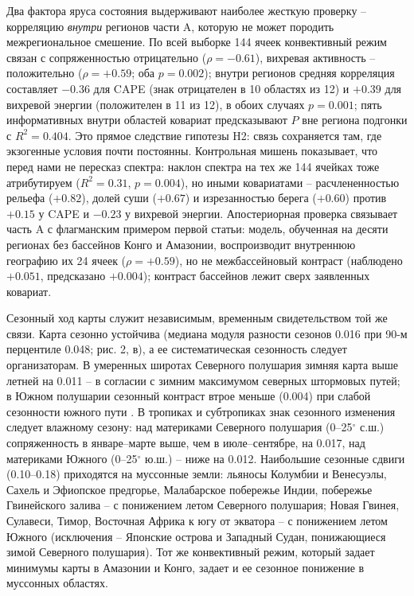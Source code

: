 \documentclass[12pt,a4paper]{article}
\begin{document}
Два фактора яруса состояния выдерживают наиболее жесткую проверку -- корреляцию \emph{внутри} регионов части A, которую не может породить межрегиональное смешение. По всей выборке 144 ячеек конвективный режим связан с сопряженностью отрицательно ($\rho = -0.61$), вихревая активность -- положительно ($\rho = +0.59$; оба $p = 0.002$); внутри регионов средняя корреляция составляет $-0.36$ для CAPE (знак отрицателен в 10 областях из 12) и $+0.39$ для вихревой энергии (положителен в 11 из 12), в обоих случаях $p = 0.001$; пять информативных внутри областей ковариат предсказывают $P$ вне региона подгонки с $R^2 = 0.404$. Это прямое следствие гипотезы H2: связь сохраняется там, где экзогенные условия почти постоянны. Контрольная мишень показывает, что перед нами не пересказ спектра: наклон спектра на тех же 144 ячейках тоже атрибутируем ($R^2 = 0.31$, $p = 0.004$), но иными ковариатами -- расчлененностью рельефа ($+0.82$), долей суши ($+0.67$) и изрезанностью берега ($+0.60$) против $+0.15$ у CAPE и $-0.23$ у вихревой энергии. Апостериорная проверка связывает часть A с флагманским примером первой статьи: модель, обученная на десяти регионах без бассейнов Конго и Амазонии, воспроизводит внутреннюю географию их 24 ячеек ($\rho = +0.59$), но не межбассейновый контраст (наблюдено $+0.051$, предсказано $+0.004$); контраст бассейнов лежит сверх заявленных ковариат.

Сезонный ход карты служит независимым, временным свидетельством той же связи. Карта сезонно устойчива (медиана модуля разности сезонов 0.016 при 90-м перцентиле 0.048; рис. 2, в), а ее систематическая сезонность следует организаторам. В умеренных широтах Северного полушария зимняя карта выше летней на 0.011 -- в согласии с зимним максимумом северных штормовых путей; в Южном полушарии сезонный контраст втрое меньше (0.004) при слабой сезонности южного пути \cite{Trenberth1991}. В тропиках и субтропиках знак сезонного изменения следует влажному сезону: над материками Северного полушария (0--25$^\circ$ с.ш.) сопряженность в январе--марте выше, чем в июле--сентябре, на 0.017, над материками Южного (0--25$^\circ$ ю.ш.) -- ниже на 0.012. Наибольшие сезонные сдвиги (0.10--0.18) приходятся на муссонные земли: льяносы Колумбии и Венесуэлы, Сахель и Эфиопское предгорье, Малабарское побережье Индии, побережье Гвинейского залива -- с понижением летом Северного полушария; Новая Гвинея, Сулавеси, Тимор, Восточная Африка к югу от экватора -- с понижением летом Южного (исключения -- Японские острова и Западный Судан, понижающиеся зимой Северного полушария). Тот же конвективный режим, который задает минимумы карты в Амазонии и Конго, задает и ее сезонное понижение в муссонных областях.
\end{document}
